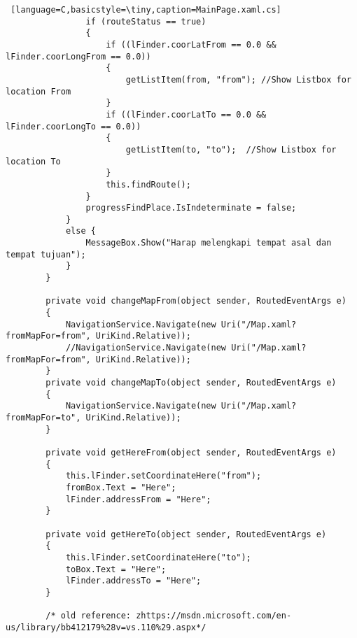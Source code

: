 \begin{lstlisting} [language=C,basicstyle=\tiny,caption=MainPage.xaml.cs]
                if (routeStatus == true)
                {
                    if ((lFinder.coorLatFrom == 0.0 && lFinder.coorLongFrom == 0.0))
                    {
                        getListItem(from, "from"); //Show Listbox for location From
                    }
                    if ((lFinder.coorLatTo == 0.0 && lFinder.coorLongTo == 0.0))
                    {
                        getListItem(to, "to");  //Show Listbox for location To
                    }
                    this.findRoute();
                }
                progressFindPlace.IsIndeterminate = false;
            }
            else {
                MessageBox.Show("Harap melengkapi tempat asal dan tempat tujuan");
            }
        }

        private void changeMapFrom(object sender, RoutedEventArgs e)
        {
            NavigationService.Navigate(new Uri("/Map.xaml?fromMapFor=from", UriKind.Relative));
            //NavigationService.Navigate(new Uri("/Map.xaml?fromMapFor=from", UriKind.Relative));    
        }
        private void changeMapTo(object sender, RoutedEventArgs e)
        {
            NavigationService.Navigate(new Uri("/Map.xaml?fromMapFor=to", UriKind.Relative));    
        }

        private void getHereFrom(object sender, RoutedEventArgs e)
        {
            this.lFinder.setCoordinateHere("from");
            fromBox.Text = "Here";
            lFinder.addressFrom = "Here";
        }

        private void getHereTo(object sender, RoutedEventArgs e)
        {
            this.lFinder.setCoordinateHere("to");
            toBox.Text = "Here";
            lFinder.addressTo = "Here";
        }

        /* old reference: zhttps://msdn.microsoft.com/en-us/library/bb412179%28v=vs.110%29.aspx*/


\end{lstlisting}
